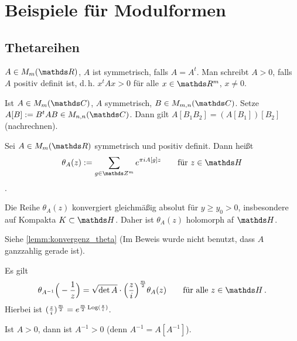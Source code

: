 \section{Beispiele für Modulformen}

\subsection{Thetareihen}

\begin{nota-list}
\item $A \in M_m(\RR)$, $A$ ist symmetrisch, falls $A = A^t$. Man schreibt $A > 0$, falls $A$ positiv definit ist, d.\,h. $x^tAx > 0$ für alle $x\in\RR^m$, $x\not=0$.
\item Ist $A \in M_m(\CC)$, $A$ symmetrisch, $B \in M_{m,n}(\CC)$. Setze $A[B] := B^tAB \in M_{n,n}(\CC)$.
Dann gilt $A[B_1B_2] = (A[B_1])[B_2]$ (nachrechnen).
\end{nota-list}

\begin{defi}
Sei $A \in M_m(\RR)$ symmetrisch und positiv definit.
Dann heißt
\[
    \theta_A(z)
    := \sum_{g \in \ZZ^m} e^{\pi i A[g]z}
    \qquad \text{für } z \in \HH
\]
.
\end{defi}

\begin{lemm}
Die Reihe $\theta_A(z)$ konvergiert gleichmäßig absolut für $y \geq y_0 > 0$, insbesondere auf Kompakta $K \subset \HH$.
Daher ist $\theta_A(z)$ holomorph af $\HH$.
\end{lemm}

\begin{bewe}
Siehe \autoref{lemm:konvergenz_theta} (Im Beweis wurde nicht benutzt, dass $A$ ganzzahlig gerade ist).
\end{bewe}

\begin{satz}\label{satz:theta_trafo}
Es gilt
\[
    \theta_{A^{-1}}\Big(-\frac{1}{z}\Big)
    = \sqrt{\det A} \cdot \Big(\frac{z}{i}\Big)^{\frac{m}{2}} \theta_A(z)
    \qquad \text{für alle } z \in \HH
    \,.
\]
Hierbei ist $(\frac{z}{i})^{\frac{m}{2}} = e^{\frac{m}{2}\operatorname{Log}(\frac{z}{i})}$.
\end{satz}

\begin{beme}
Ist $A > 0$, dann ist $A^{-1} > 0$ (denn $A^{-1} = A[A^{-1}]$).
\end{beme}

